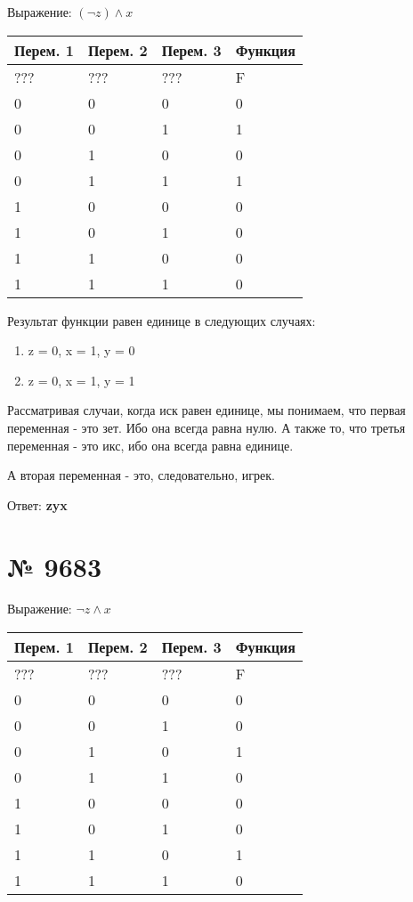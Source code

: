 \documentclass[11pt]{article} %
\begin{document}
Выражение: $(\lnot{z})\land x$

\vspace{2mm}
\begin{tabular}{ | l | l | l | l |  }
\hline
Перем. 1 & Перем. 2 & Перем. 3 & Функция \\ \hline
??? & ??? & ??? & F \\ \hline
0 & 0 & 0 & 0 \\ \hline
0 & 0 & 1 & 1 \\ \hline
0 & 1 & 0 & 0 \\ \hline
0 & 1 & 1 & 1 \\ \hline
1 & 0 & 0 & 0 \\ \hline
1 & 0 & 1 & 0 \\ \hline
1 & 1 & 0 & 0 \\ \hline
1 & 1 & 1 & 0 \\ \hline
\end{tabular}

\vspace{2mm}

Результат функции равен единице в следующих случаях:

\begin{enumerate}
	\item z = 0, x = 1, y = 0
	\item z = 0, x = 1, y = 1
\end{enumerate}

Рассматривая случаи, когда иск равен единице, мы понимаем, что первая переменная - это зет. Ибо она всегда равна нулю. А также то, что третья переменная - это икс, ибо она всегда равна единице.

А вторая переменная - это, следовательно, игрек.

Ответ: \textbf{zyx}

\section{№ \textbf{9683}}

Выражение: $\lnot{z} \land x$

\vspace{2mm}
\begin{tabular}{ | l | l | l | l | }
\hline
Перем. 1 & Перем. 2 & Перем. 3 & Функция \\ \hline
??? & ??? & ??? & F \\ \hline
0 & 0 & 0 & 0 \\ \hline
0 & 0 & 1 & 0 \\ \hline
0 & 1 & 0 & 1 \\ \hline
0 & 1 & 1 & 0 \\ \hline
1 & 0 & 0 & 0 \\ \hline
1 & 0 & 1 & 0 \\ \hline
1 & 1 & 0 & 1 \\ \hline
1 & 1 & 1 & 0 \\ \hline
\end{tabular}
\end{document}
